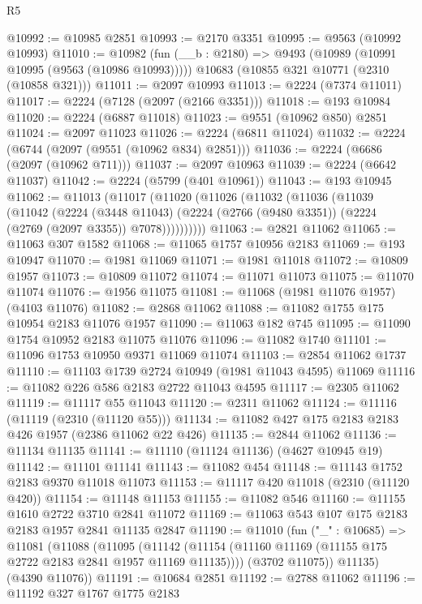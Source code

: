 \begin{lexlean}{R5}
\begin{coremodule}
@10992 := @10985 @2851
@10993 := @2170 @3351
@10995 := @9563 (@10992 @10993)
@11010 := @10982
    (fun (__b : @2180) => @9493 (@10989 (@10991 @10995 (@9563 (@10986 @10993)))))
    @10683
    (@10855 @321 @10771 (@2310 (@10858 @321)))
@11011 := @2097 @10993
@11013 := @2224 (@7374 @11011)
@11017 := @2224 (@7128 (@2097 (@2166 @3351)))
@11018 := @193 @10984
@11020 := @2224 (@6887 @11018)
@11023 := @9551 (@10962 @850) @2851
@11024 := @2097 @11023
@11026 := @2224 (@6811 @11024)
@11032 := @2224 (@6744 (@2097 (@9551 (@10962 @834) @2851)))
@11036 := @2224 (@6686 (@2097 (@10962 @711)))
@11037 := @2097 @10963
@11039 := @2224 (@6642 @11037)
@11042 := @2224 (@5799 (@401 @10961))
@11043 := @193 @10945
@11062 := @11013
    (@11017
      (@11020
        (@11026
          (@11032
            (@11036
              (@11039
                (@11042
                  (@2224
                    (@3448 @11043)
                    (@2224 (@2766 (@9480 @3351)) (@2224 (@2769 (@2097 @3355)) @7078))))))))))
@11063 := @2821 @11062
@11065 := @11063 @307 @1582
@11068 := @11065 @1757 @10956 @2183
@11069 := @193 @10947
@11070 := @1981 @11069
@11071 := @1981 @11018
@11072 := @10809 @1957
@11073 := @10809 @11072
@11074 := @11071 @11073
@11075 := @11070 @11074
@11076 := @1956 @11075
@11081 := @11068 (@1981 @11076 @1957) (@4103 @11076)
@11082 := @2868 @11062
@11088 := @11082 @1755 @175 @10954 @2183 @11076 @1957
@11090 := @11063 @182 @745
@11095 := @11090 @1754 @10952 @2183 @11075 @11076
@11096 := @11082 @1740
@11101 := @11096 @1753 @10950 @9371 @11069 @11074
@11103 := @2854 @11062 @1737
@11110 := @11103 @1739 @2724 @10949 (@1981 @11043 @4595) @11069
@11116 := @11082 @226 @586 @2183 @2722 @11043 @4595
@11117 := @2305 @11062
@11119 := @11117 @55 @11043
@11120 := @2311 @11062
@11124 := @11116 (@11119 (@2310 (@11120 @55)))
@11134 := @11082 @427 @175 @2183 @2183 @426 @1957 (@2386 @11062 @22 @426)
@11135 := @2844 @11062
@11136 := @11134 @11135
@11141 := @11110 (@11124 @11136) (@4627 @10945 @19)
@11142 := @11101 @11141
@11143 := @11082 @454
@11148 := @11143 @1752 @2183 @9370 @11018 @11073
@11153 := @11117 @420 @11018 (@2310 (@11120 @420))
@11154 := @11148 @11153
@11155 := @11082 @546
@11160 := @11155 @1610 @2722 @3710 @2841 @11072
@11169 := @11063 @543 @107 @175 @2183 @2183 @1957 @2841 @11135 @2847
@11190 := @11010
    (fun ("_" : @10685) =>
    @11081
      (@11088
        (@11095
          (@11142 (@11154 (@11160 @11169 (@11155 @175 @2722 @2183 @2841 @1957 @11169 @11135))))
          (@3702 @11075))
        @11135)
      (@4390 @11076))
@11191 := @10684 @2851
@11192 := @2788 @11062
@11196 := @11192 @327 @1767 @1775 @2183

\end{coremodule}
\end{lexlean}
